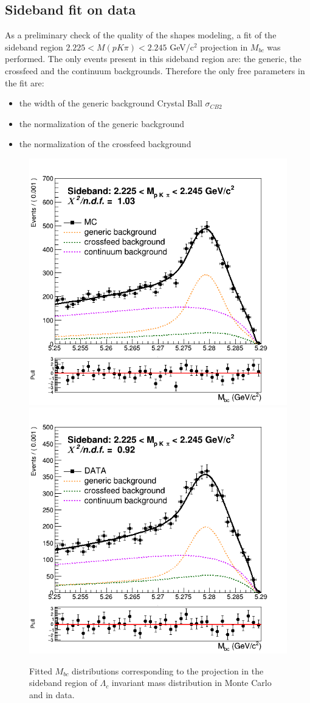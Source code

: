 \subsection{Sideband fit on data}\label{sec:corrDataSidebandFit}

As a preliminary check of the quality of the shapes modeling, a fit of the sideband region $2.225 < M(p K \pi) < 2.245$ GeV/c$^2$  projection in $M_{bc}$ was performed. The only events present in this sideband region are: the generic, the crossfeed and the continuum backgrounds. Therefore the only free parameters in the fit are:
\begin{itemize}
\item the width of the generic background Crystal Ball $\sigma_{CB2}$
\item the normalization of the generic background
\item the normalization of the crossfeed background
\end{itemize}






\begin{figure}[H]
\centering
\subcaptionbox{\label{fig:MbcSidebandFit_onMC_chargedCorr_LambdaC}}
{\includegraphics[width=.45\textwidth]{04-chargedCorrBtoLambda/figs/MbcSidebandFit_onMC_chargedCorr_LambdaC.png}} \quad
\subcaptionbox{\label{fig:MC_on_off_resonance_stream2_anticorrLambda_continuum_2D_Mbc_corrected}}
{\includegraphics[width=.45\textwidth]{04-chargedCorrBtoLambda/figs/MbcSidebandFit_onData_chargedCorr_LambdaC.png}} \quad
\caption{Fitted $M_{bc}$ distributions corresponding to the projection in the sideband region of $\Lambda_c$ invariant mass distribution in Monte Carlo  and in data.}
\end{figure}






